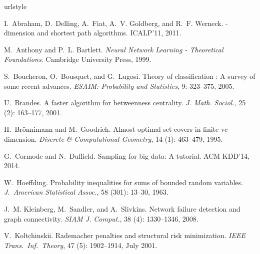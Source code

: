 \documentclass{sig-alternate-2013}
\begin{document}
%
%
\begin{thebibliography}{17}
\providecommand{\natexlab}[1]{#1}
\providecommand{\url}[1]{\texttt{#1}}
\expandafter\ifx\csname urlstyle\endcsname\relax
  \providecommand{\doi}[1]{doi: #1}\else
  \providecommand{\doi}{doi: \begingroup \urlstyle{rm}\Url}\fi

I.~Abraham, D.~Delling, A.~Fiat, A.~V. Goldberg, and R.~F. Werneck.
-dimension and shortest path algorithms.
\newblock ICALP'11, 2011.

M.~Anthony and P.~L. Bartlett.
\newblock \emph{Neural Network Learning - Theoretical Foundations}.
\newblock Cambridge University Press, 1999.

S.~Boucheron, O.~Bousquet, and G.~Lugosi.
\newblock Theory of classification : A survey of some recent advances.
\newblock \emph{{ESAIM}: Probability and Statistics}, 9: 323--375,
  2005.

U.~Brandes.
\newblock A faster algorithm for betweenness centrality.
\newblock \emph{J. Math. Sociol.}, 25 (2): 163--177, 2001.

H.~Br{\"o}nnimann and M.~Goodrich.
\newblock Almost optimal set covers in finite vc-dimension.
\newblock \emph{Discrete \& Computational Geometry}, 14 (1):
  463--479, 1995.

G.~Cormode and N.~Duffield.
\newblock Sampling for big data: A tutorial.
\newblock ACM KDD'14, 2014.

W.~Hoeffding.
\newblock Probability inequalities for sums of bounded random variables.
\newblock \emph{J.~American Statistical Assoc.}, 58 (301):
  13--30, 1963.

J.~M. Kleinberg, M.~Sandler, and A.~Slivkins.
\newblock Network failure detection and graph connectivity.
\newblock \emph{SIAM J. Comput.}, 38 (4): 1330--1346, 2008.

V.~Koltchinskii.
\newblock Rademacher penalties and structural risk minimization.
\newblock \emph{IEEE Trans.~Inf.~Theory}, 47 (5): 1902--1914,
  July 2001.


\end{thebibliography}
\end{document}
